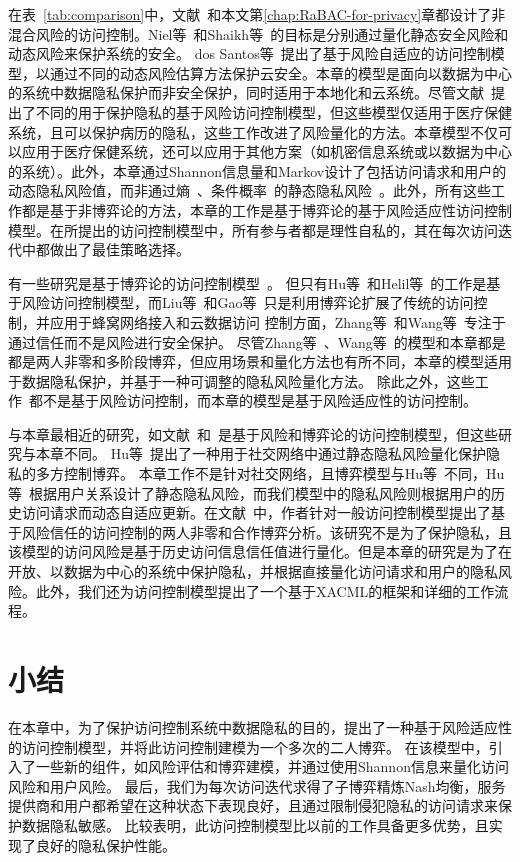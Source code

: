 在表~\ref{tab:comparison}中，文献~\cite{ni2010risk,shaikh2012dynamic,santos2016framework,wang2011quantified,zhang2018privacy,zhen2015risk}和本文第\ref{chap:RaBAC-for-privacy}章都设计了非混合风险的访问控制。Niel等~\cite{ni2010risk}和Shaikh等~\cite{shaikh2012dynamic}的目标是分别通过量化静态安全风险和动态风险来保护系统的安全。 dos Santos等~\cite{santos2016framework}提出了基于风险自适应的访问控制模型，以通过不同的动态风险估算方法保护云安全。本章的模型是面向以数据为中心的系统中数据隐私保护而非安全保护，同时适用于本地化和云系统。尽管文献~\cite{wang2011quantified,zhen2015risk,zhang2018privacy}提出了不同的用于保护隐私的基于风险访问控制模型，但这些模型仅适用于医疗保健系统，且可以保护病历的隐私，这些工作改进了风险量化的方法。本章模型不仅可以应用于医疗保健系统，还可以应用于其他方案（如机密信息系统或以数据为中心的系统）。此外，本章通过Shannon信息量和Markov设计了包括访问请求和用户的动态隐私风险值，而非通过熵~\cite{zhen2015risk}、条件概率~\cite{zhang2018privacy}的静态隐私风险~\cite{wang2011quantified}。此外，所有这些工作都是基于非博弈论的方法，本章的工作是基于博弈论的基于风险适应性访问控制模型。在所提出的访问控制模型中，所有参与者都是理性自私的，其在每次访问迭代中都做出了最佳策略选择。


有一些研究是基于博弈论的访问控制模型~\cite{liu2016dynamic,gao2018game,zhang2015towards,wang2019game,hu2014game,helil2017non}。 但只有Hu等~\cite{hu2014game}和Helil等~\cite{helil2017non}的工作是基于风险访问控制模型，而Liu等~\cite{liu2016dynamic}和Gao等~\cite{gao2018game}只是利用博弈论扩展了传统的访问控制，并应用于蜂窝网络接入和云数据访问 控制方面，Zhang等~\cite{zhang2015towards}和Wang等~\cite{wang2019game}专注于通过信任而不是风险进行安全保护。 尽管Zhang等~\cite{zhang2015towards}、Wang等~\cite{wang2019game}的模型和本章都是都是两人非零和多阶段博弈，但应用场景和量化方法也有所不同，本章的模型适用于数据隐私保护，并基于一种可调整的隐私风险量化方法。 除此之外，这些工作~\cite{liu2016dynamic,gao2018game,zhang2015towards,wang2019game}都不是基于风险访问控制，而本章的模型是基于风险适应性的访问控制。

与本章最相近的研究，如文献~\cite{hu2014game}和~\cite{helil2017non}是基于风险和博弈论的访问控制模型，但这些研究与本章不同。 Hu等~\cite{hu2014game}提出了一种用于社交网络中通过静态隐私风险量化保护隐私的多方控制博弈。
本章工作不是针对社交网络，且博弈模型与Hu等~\cite{hu2014game}不同，Hu等~\cite{hu2014game}根据用户关系设计了静态隐私风险，而我们模型中的隐私风险则根据用户的历史访问请求而动态自适应更新。在文献~\cite{helil2017non}中，作者针对一般访问控制模型提出了基于风险信任的访问控制的两人非零和合作博弈分析。该研究不是为了保护隐私，且该模型的访问风险是基于历史访问信息信任值进行量化。但是本章的研究是为了在开放、以数据为中心的系统中保护隐私，并根据直接量化访问请求和用户的隐私风险。此外，我们还为访问控制模型提出了一个基于XACML的框架和详细的工作流程。

\section{小结}\label{sec:conclusions}

在本章中，为了保护访问控制系统中数据隐私的目的，提出了一种基于风险适应性的访问控制模型，并将此访问控制建模为一个多次的二人博弈。 在该模型中，引入了一些新的组件，如风险评估和博弈建模，并通过使用Shannon信息来量化访问风险和用户风险。 最后，我们为每次访问迭代求得了子博弈精炼Nash均衡，服务提供商和用户都希望在这种状态下表现良好，且通过限制侵犯隐私的访问请求来保护数据隐私敏感。 比较表明，此访问控制模型比以前的工作具备更多优势，且实现了良好的隐私保护性能。